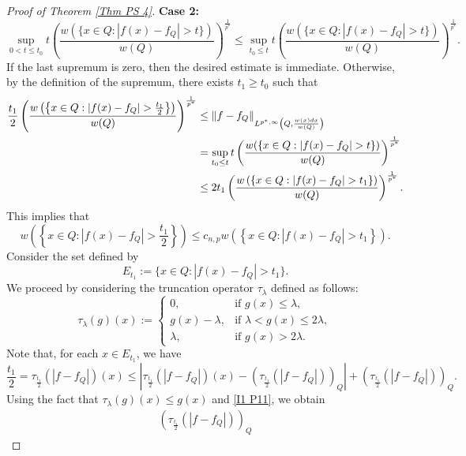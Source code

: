 \documentclass[10pt,a4paper]{amsart}
\newcommand{\strt}[1]{\rule{0pt}{#1}}
\begin{document}
\begin{proof}[Proof of Theorem \ref{Thm PS 4}]
\textbf{Case 2:}
\begin{equation*}
    \sup_{0<t\le t_0} t \left(\frac{w(\{x\in Q:|f(x)-f_Q|>t\})}{w(Q)}\right)^\frac{1}{p^*} \le \sup_{t_0\le t} t \left(\frac{w(\{x\in Q:|f(x)-f_Q|>t\})}{w(Q)}\right)^\frac{1}{p^*}.
\end{equation*}
If the last supremum is zero, then the desired estimate is immediate. Otherwise, by the definition of the supremum, there exists $t_1\ge t_0$ such that
\begin{align*}
    \frac{t_1}{2} \left( \frac{w\left(\left\{x\in Q:|f(x)-f_Q|>\frac{t_1}{2}\right\}\right)}{w(Q)} \right)^\frac{1}{p^*} 
    &\le \left\| f-f_Q\right\|_{\strt{2.3ex} L^{p^*,\infty}\left(Q,\frac{w(x)dx}{w(Q)}\right)} \\
    &= \sup_{t_0\le t} t \left(\frac{w(\{x\in Q:|f(x)-f_Q|>t\})}{w(Q)}\right)^\frac{1}{p^*} \\
    &\le 2t_1 \left( \frac{w\left(\left\{x\in Q:|f(x)-f_Q|>t_1\right\}\right)}{w(Q)} \right)^\frac{1}{p^*}.
\end{align*}
This implies that 
\begin{equation}\label{level comparison fQ}
    w\left(\left\{x\in Q:|f(x)-f_Q|>\frac{t_1}{2}\right\}\right) \le c_{n,p} w\left(\left\{x\in Q:|f(x)-f_Q|>t_1\right\}\right).
\end{equation}
Consider the set defined by 
\begin{equation*}
    E_{t_1}:=\{x\in Q:|f(x)-f_Q|>t_1\}.
\end{equation*}
We proceed by considering the truncation operator
$\tau_\lambda$ defined as follows:
\begin{equation*}
    \tau_\lambda(g)(x):=\begin{cases}0, & \text{if } g(x)\le \lambda,\\ g(x)-\lambda, & \text{if } \lambda<g(x)\le 2\lambda,\\ \lambda, & \text{if } g(x)>2\lambda.\end{cases}
\end{equation*}
Note that, for each $x\in E_{t_1}$, we have
\begin{equation*}
    \frac{t_1}{2}=\tau_{\frac{t_1}{2}}(|f-f_Q|)(x) \le \left| \tau_{\frac{t_1}{2}}(|f-f_Q|)(x)-\left(\tau_{\frac{t_1}{2}}(|f-f_Q|)\right)_Q \right|+\left(\tau_{\frac{t_1}{2}}(|f-f_Q|)\right)_Q.
\end{equation*}
Using the fact that $\tau_\lambda(g)(x)\le g(x)$ and \eqref{I1 P11}, we obtain
\begin{align*}
    \left(\tau_{\frac{t_1}{2}}(|f-f_Q|)\right)_Q

\end{align*}
\end{proof}
\end{document}
